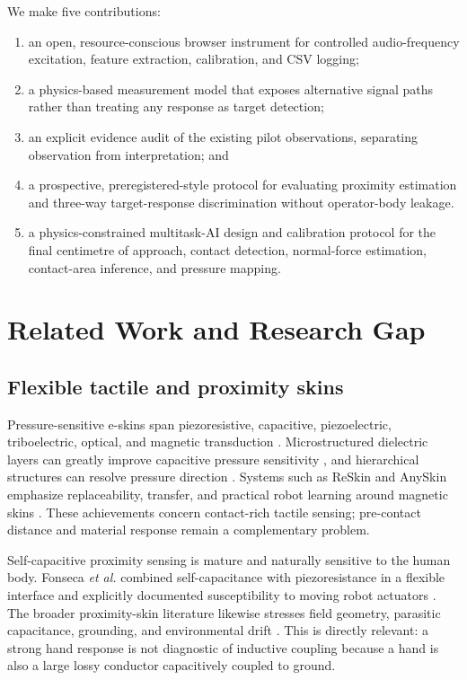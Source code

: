 \documentclass[10pt]{article}
\begin{document}
We make five contributions:
\begin{enumerate}
  \item an open, resource-conscious browser instrument for controlled audio-frequency excitation, feature extraction, calibration, and CSV logging;
  \item a physics-based measurement model that exposes alternative signal paths rather than treating any response as target detection;
  \item an explicit evidence audit of the existing pilot observations, separating observation from interpretation; and
  \item a prospective, preregistered-style protocol for evaluating proximity estimation and three-way target-response discrimination without operator-body leakage.
  \item a physics-constrained multitask-AI design and calibration protocol for the final centimetre of approach, contact detection, normal-force estimation, contact-area inference, and pressure mapping.
\end{enumerate}

\section{Related Work and Research Gap}
\subsection{Flexible tactile and proximity skins}
Pressure-sensitive e-skins span piezoresistive, capacitive, piezoelectric, triboelectric, optical, and magnetic transduction \citep{hammock2013evolution,nguyen2022recent,roberts2021soft}. Microstructured dielectric layers can greatly improve capacitive pressure sensitivity \citep{mannsfeld2010pressure}, and hierarchical structures can resolve pressure direction \citep{boutry2018direction}. Systems such as ReSkin and AnySkin emphasize replaceability, transfer, and practical robot learning around magnetic skins \citep{bhirangi2022reskin,bhirangi2024anyskin}. These achievements concern contact-rich tactile sensing; pre-contact distance and material response remain a complementary problem.

Self-capacitive proximity sensing is mature and naturally sensitive to the human body. Fonseca \emph{et al.} combined self-capacitance with piezoresistance in a flexible interface and explicitly documented susceptibility to moving robot actuators \citep{fonseca2023hybrid}. The broader proximity-skin literature likewise stresses field geometry, parasitic capacitance, grounding, and environmental drift \citep{wu2024proximity}. This is directly relevant: a strong hand response is not diagnostic of inductive coupling because a hand is also a large lossy conductor capacitively coupled to ground.
\end{document}
